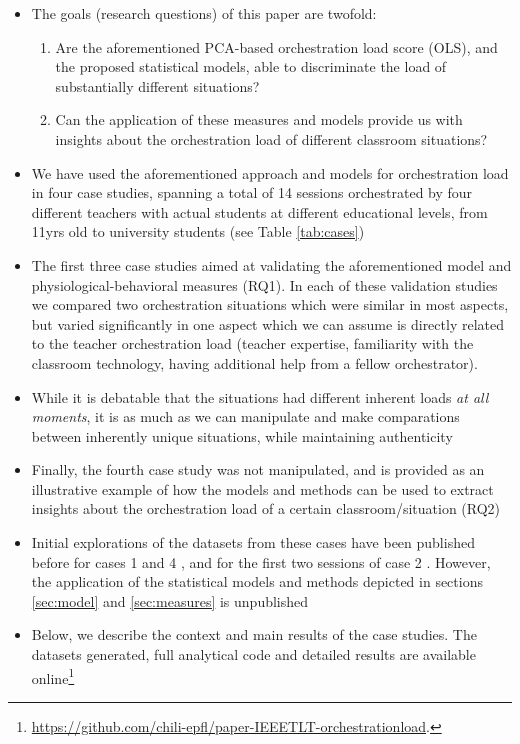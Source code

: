 \documentclass[10pt,journal,compsoc]{IEEEtran}
\begin{document}
\begin{itemize}
\item The goals (research questions) of this paper are twofold:
\begin{enumerate}
\item Are the aforementioned PCA-based orchestration load score (OLS), and the proposed statistical models, able to discriminate the load of substantially different situations?
\item Can the application of these measures and models provide us with insights about the orchestration load of different classroom situations?
\end{enumerate}
\item We have used the aforementioned approach and models for orchestration load in four case studies, spanning a total of 14 sessions
orchestrated by four different teachers with actual students at different educational levels, from 11yrs old to university students (see Table \ref{tab:cases})
\item The first three case studies aimed at validating the aforementioned model and physiological-behavioral measures (RQ1). In each of these validation studies we compared two orchestration situations which were similar in most aspects, but varied significantly in one aspect which we can assume is directly related to the teacher orchestration load (teacher expertise, familiarity with the classroom technology, having additional help from a fellow orchestrator). 
\item While it is debatable that the situations had different inherent loads \textit{at all moments}, it is as much as we can manipulate and make comparations between inherently unique situations, while maintaining authenticity
\item Finally, the fourth case study was not manipulated, and is provided as an illustrative example of how the models and methods can be used to extract insights about the orchestration load of a certain classroom/situation (RQ2)
\item Initial explorations of the datasets from these cases have been published before for cases 1 and 4 \cite{Prieto2015cscl}, and for the
first two sessions of case 2 \cite{Prieto2015ectel}. However, the application of the statistical models and methods depicted in sections \ref{sec:model} and \ref{sec:measures} is unpublished
\item Below, we describe the context and main results of the case studies. The datasets generated, full analytical code and detailed results are available online\footnote{\href{https://github.com/chili-epfl/paper-IEEETLT-orchestrationload}{https://github.com/chili-epfl/paper-IEEETLT-orchestrationload}.}

\end{itemize}
\end{document}
